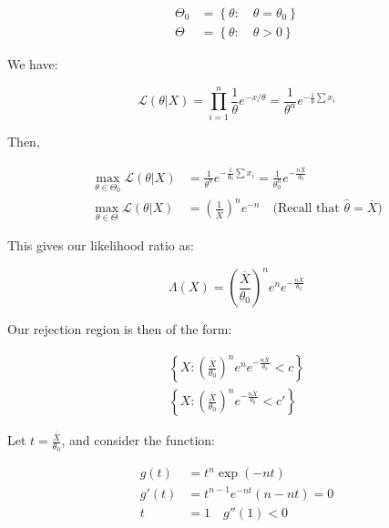 \documentclass{article}
\begin{document}
\begin{equation*}
    \begin{split}
        \Theta_0 &= \left\{\theta: \quad \theta = \theta_0 \right\}\\
        \Theta &= \left\{\theta: \quad \theta >0 \right\}
    \end{split}
\end{equation*}


We have:

\begin{equation*}
    \mathcal{L}(\theta|X) = \prod_{i=1}^n \frac{1}{\theta} e^{-x/\theta} = \frac{1}{\theta^n} e^{-\frac{1}{\theta} \sum x_i} 
\end{equation*}

Then,

\begin{equation*}
    \begin{split}
        \max_{\theta\in\Theta_0} \mathcal{L}(\theta|X) &= \frac{1}{\theta^n} e^{-\frac{1}{\theta_0} \sum x_i} = \frac{1}{\theta_0^n} e^{- \frac{n\overline{X}}{\theta_0}}\\
        \max_{\theta\in\Theta} \mathcal{L}(\theta|X) &= \left(\frac{1}{\overline{X}}\right)^n e^{-n} \quad \text{(Recall that $\hat{\theta} = \overline{X}$)}
    \end{split}
\end{equation*}

This gives our likelihood ratio as:

\begin{equation*}
    \Lambda(X) = \left(\frac{\overline{X}}{\theta_0}\right)^n e^n e^{-\frac{n\overline{X}}{\theta_0}}
\end{equation*}

Our rejection region is then of the form:

\begin{equation*}
    \begin{split}
        \left\{ X : \left(\frac{\overline{X}}{\theta_0} \right)^n e^n e^{-\frac{n\overline{X}}{\theta_0}} < c \right\} \\
        \left\{ X : \left(\frac{\overline{X}}{\theta_0} \right)^n  e^{-\frac{n\overline{X}}{\theta_0}} < c' \right\}
    \end{split}
\end{equation*}

Let $t = \frac{\overline{X}}{\theta_0}$, and consider the function:

\begin{equation*}
    \begin{split}
        g(t) &= t^n \exp(-nt)\\
        g'(t) &= t^{n-1}e^{-nt}(n-nt) = 0\\
        t&= 1 \quad g''(1) < 0
    \end{split}
\end{equation*}
\end{document}
